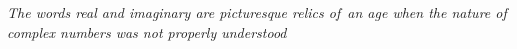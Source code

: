 \documentclass[preview]{standalone}
\begin{document}
\begin{center}
\textit{The words real and imaginary are picturesque relics of\
        an age when the nature of complex numbers was not properly understood}
\end{center}
\end{document}
